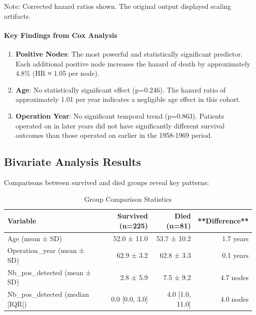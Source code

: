 \documentclass[12pt,a4paper]{article}
\begin{document}
Note: Corrected hazard ratios shown. The original output displayed scaling artifacts.

\paragraph{Key Findings from Cox Analysis}

\begin{enumerate}
    \item \textbf{Positive Nodes}: The most powerful and statistically significant predictor. Each additional positive node increases the hazard of death by approximately 4.8\% (HR ≈ 1.05 per node).
    
    \item \textbf{Age}: No statistically significant effect (p=0.246). The hazard ratio of approximately 1.01 per year indicates a negligible age effect in this cohort.
    
    \item \textbf{Operation Year}: No significant temporal trend (p=0.863). Patients operated on in later years did not have significantly different survival outcomes than those operated on earlier in the 1958-1969 period.
\end{enumerate}

\subsection{Bivariate Analysis Results}

Comparisons between survived and died groups reveal key patterns:

\begin{table}[H]
\centering
\caption{Group Comparison Statistics}
\label{tab:group_comparison}
\begin{tabular}{lrrr}
\toprule
\textbf{Variable} & \textbf{Survived (n=225)} & \textbf{Died (n=81)} & **Difference** \\
\midrule
Age (mean ± SD) & 52.0 ± 11.0 & 53.7 ± 10.2 & 1.7 years \\
Operation\_year (mean ± SD) & 62.9 ± 3.2 & 62.8 ± 3.3 & 0.1 years \\
Nb\_pos\_detected (mean ± SD) & 2.8 ± 5.9 & 7.5 ± 9.2 & 4.7 nodes \\
\midrule
Nb\_pos\_detected (median [IQR]) & 0.0 [0.0, 3.0] & 4.0 [1.0, 11.0] & 4.0 nodes \\
\bottomrule
\end{tabular}
\end{table}
\end{document}
